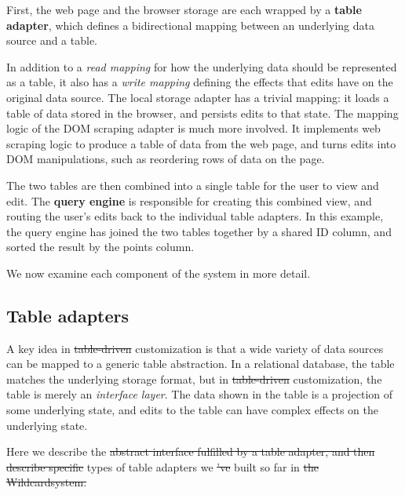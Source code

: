 \documentclass[sigplan,screen,10pt,anonymous,review]{acmart}
\providecommand{\DIFadd}[1]{{\protect\color{blue}\uwave{#1}}} %
\providecommand{\DIFdel}[1]{{\protect\color{red}\sout{#1}}}                      %
\providecommand{\DIFaddbegin}{} %
\providecommand{\DIFaddend}{} %
\providecommand{\DIFdelbegin}{} %
\providecommand{\DIFdelend}{} %
\begin{document}
First, the web page and the browser storage are each wrapped by a
\textbf{table adapter}, which defines a bidirectional mapping between an
underlying data source and a table.

In addition to a \emph{read mapping} for how the underlying data should
be represented as a table, it also has a \emph{write mapping} defining
the effects that edits have on the original data source. The local
storage adapter has a trivial mapping: it loads a table of data stored
in the browser, and persists edits to that state. The mapping logic of
the DOM scraping adapter is much more involved. It implements web
scraping logic to produce a table of data from the web page, and turns
edits into DOM manipulations, such as reordering rows of data on the
page.

The two tables are then combined into a single table for the user to
view and edit. The \textbf{query engine} is responsible for creating
this combined view, and routing the user's edits back to the individual
table adapters. In this example, the query engine has joined the two
tables together by a shared ID column, and sorted the result by the
points column.

We now examine each component of the system in more detail.

\hypertarget{table-adapters}{%
\subsection{Table adapters}\label{table-adapters}}

A key idea in \DIFdelbegin \DIFdel{table-driven }\DIFdelend \DIFaddbegin \DIFadd{data-driven }\DIFaddend customization is that a wide variety of data
sources can be mapped to a generic table abstraction. In a relational
database, the table matches the underlying storage format, but in
\DIFdelbegin \DIFdel{table-driven }\DIFdelend \DIFaddbegin \DIFadd{data-driven }\DIFaddend customization, the table is merely an \emph{interface
layer}. The data shown in the table is a projection of some underlying
state, and edits to the table can have complex effects on the underlying
state.

Here we describe the \DIFdelbegin \DIFdel{abstract interface fulfilled by a table adapter,
and then describe specific }\DIFdelend \DIFaddbegin \DIFadd{three }\DIFaddend types of table adapters we \DIFdelbegin \DIFdel{'ve }\DIFdelend \DIFaddbegin \DIFadd{have }\DIFaddend built so far
in \DIFdelbegin \DIFdel{the Wildcardsystem. }%
\end{document}
